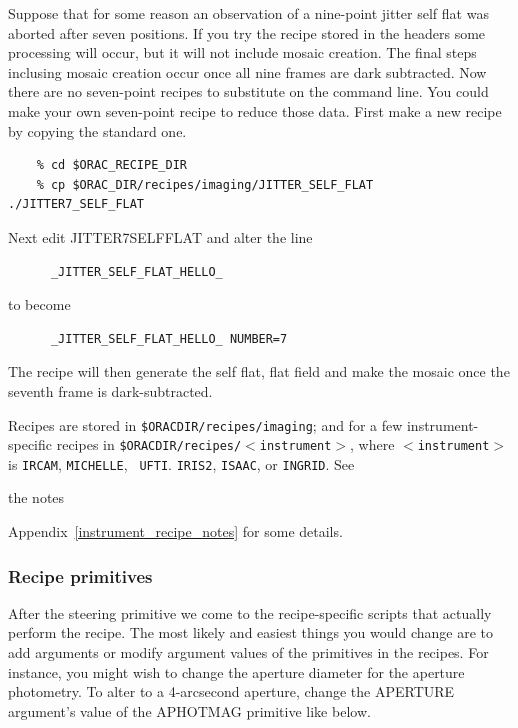 \documentclass[twoside,11pt]{article}
\newcommand{\htmlref}[2]{#1}
\newenvironment{latexonly}{}{}
\newcommand{\xlabel}[1]{}
\renewcommand{\_}{\texttt{\symbol{95}}}
\begin{document}
Suppose that for some reason an observation of a nine-point jitter
self flat was aborted after seven positions.  If you try the recipe
stored in the headers some processing will occur, but it will not
include mosaic creation.  The final steps inclusing mosaic creation
occur once all nine frames are dark subtracted.  Now there are no
seven-point recipes to substitute on the command line.  You could make
your own seven-point recipe to reduce those data.  First make a new
recipe by copying the standard one.

\begin{verbatim}
    % cd $ORAC_RECIPE_DIR
    % cp $ORAC_DIR/recipes/imaging/JITTER_SELF_FLAT ./JITTER7_SELF_FLAT
\end{verbatim}
Next edit JITTER7\_SELF\_FLAT and alter the line

\begin{verbatim}
      _JITTER_SELF_FLAT_HELLO_
\end{verbatim}
to become

\begin{verbatim}
      _JITTER_SELF_FLAT_HELLO_ NUMBER=7
\end{verbatim}
The recipe will then generate the self flat, flat field and make the
mosaic once the seventh frame is dark-subtracted.

Recipes are stored in {\tt\$ORAC\_DIR/recipes/imaging}; and for a few
instrument-specific recipes in {\tt\$ORAC\_DIR/recipes/$<$instrument$>$},
where {\tt$<$instrument$>$} is {\tt IRCAM}, {\tt MICHELLE}, {\tt
UFTI}. {\tt IRIS2}, {\tt ISAAC}, or {\tt INGRID}.  See 
\begin{htmlonly}
\htmlref{the notes}{instrument_recipe_notes}
\end{htmlonly}
\begin{latexonly}
Appendix~\ref{instrument_recipe_notes}
\end{latexonly}
for some details.

\subsubsection{\xlabel{recipe_primitives}Recipe primitives\label{recipe_primitives}}

After the steering primitive we come to the recipe-specific scripts
that actually perform the recipe.  The most likely and easiest things
you would change are to add arguments or modify argument values of the
primitives in the recipes.  For instance, you might wish to change the
aperture diameter for the aperture photometry.  To alter to a
4-arcsecond aperture, change the APERTURE argument's value of the
\_APHOT\_MAG\_ primitive like below.
\end{document}
